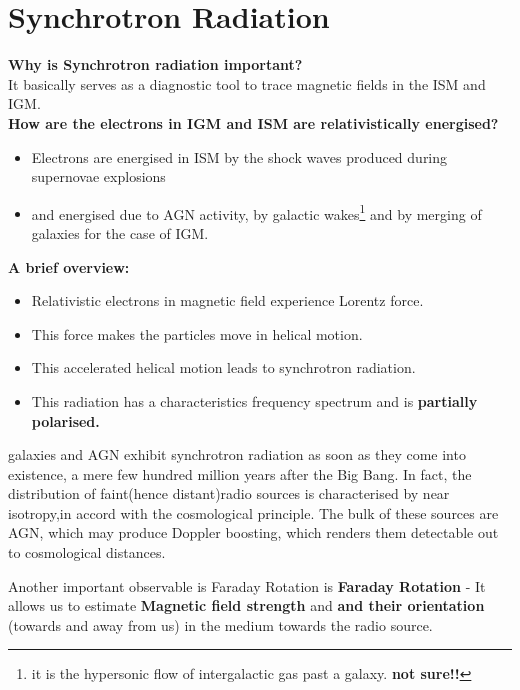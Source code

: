 \documentclass[12pt]{report}
\newcommand{\fn}[1]{\footnote{#1}}
\newcommand{\cbox}{tcolorbox}
\begin{document}
\section{Synchrotron Radiation}
\textbf{Why is Synchrotron radiation important? }\\
It basically serves as a diagnostic tool to trace magnetic fields in the ISM and IGM. \\
\textbf{How are the electrons in IGM and ISM are relativistically energised?}\\
\begin{itemize}
\item Electrons are energised in ISM by the shock waves produced during supernovae explosions\\
\item and energised due to AGN activity, by galactic wakes\fn{it is the hypersonic flow of intergalactic gas past a galaxy. \textbf{not sure!!} } and by merging of galaxies for the case of IGM.
\end{itemize}
\textbf{A brief overview:}
\begin{itemize}
\item Relativistic electrons in magnetic field experience Lorentz force.
\item This force makes the particles move in helical motion.
\item This accelerated helical motion leads to synchrotron radiation.
\item This radiation has a characteristics frequency spectrum and is \textbf{partially polarised.}
\end{itemize}
\begin{\cbox}
 galaxies and AGN exhibit synchrotron radiation as soon as they come into existence, a mere few hundred million years after the Big Bang. In fact, the distribution of faint(hence distant)radio sources is characterised by near isotropy,in accord with the cosmological principle. The bulk of these sources are AGN, which may produce Doppler boosting, which renders them detectable out to cosmological distances. 
\end{\cbox}
Another important observable is Faraday Rotation is \textbf{Faraday Rotation} - It allows us to estimate \textbf{Magnetic field strength} and \textbf{and their orientation} (towards and away from us) in the medium towards the radio source.
\end{document}
